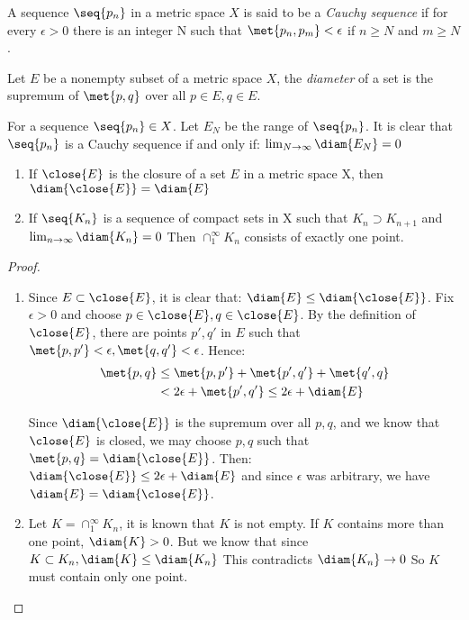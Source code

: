 \documentclass[12pt, letterpaper]{paper}
\begin{document}
A sequence $\seq{p_n}$ in a metric space $X$ is said to be a
\emph{Cauchy sequence} if for every $\epsilon >0$ there is an integer
N such that $\met{p_n, p_m} < \epsilon$ if $n \geq N$ and $m \geq N$.

Let $E$ be a nonempty subset of a metric space $X$, the
\emph{diameter} of a set is the supremum of $\met{p,q}$ over all
$p \in E, q \in E$.

For a sequence $\seq{p_{n}} \in X$. Let $E_N$ be the range of
$\seq{p_n}$. It is clear that $\seq{p_n}$ is a Cauchy sequence if and
only if: $\lim_{N\to\infty} \diam{ E_N } = 0$

\begin{theorem}
  \label{thr:3.10}
  \begin{enumerate}
  \item If $\close{E}$ is the closure of a set $E$ in a metric space
    X, then $\diam{\close{E}} = \diam{E}$
  \item If $\seq{K_n}$ is a sequence of compact sets in X such that
    $K_n \supset K_{n+1}$ and $\lim_{n\to \infty} \diam{K_n} = 0$ Then
    $\cap_1^{\infty} K_n$ consists of exactly one point.
  \end{enumerate}
\end{theorem}
\begin{proof}
  \begin{enumerate}
  \item Since $E \subset \close{E}$, it is clear that:
    $\diam{E} \leq \diam{\close{E}}$. Fix $\epsilon > 0$ and choose
    $p \in \close{E}, q \in \close{E}$. By the definition of
    $\close{E}$, there are points $p', q'$ in $E$ such that
    $\met{p, p'} < \epsilon, \met{q,q'} < \epsilon$. Hence:
    \begin{align*}
      \met{p,q} &\leq \met{ p, p'} + \met{ p', q'} + \met{ q', q}\\
                &< 2\epsilon + \met{ p', q'} \leq 2\epsilon + \diam{E}\\
    \end{align*}

    Since $\diam{\close{E}}$ is the supremum over all $p,q$, and we
    know that $\close{E}$ is closed, we may choose $p,q$ such that
    $\met{p,q} = \diam{\close{E}}$. Then:
    $\diam{\close{E}} \leq 2\epsilon + \diam{E}$ and since $\epsilon$
    was arbitrary, we have $\diam{E} = \diam{\close{E}}$.
  \item Let $K = \cap_1^{\infty} K_n$, it is known that $K$ is not
    empty. If $K$ contains more than one point, $\diam{K} > 0$. But we
    know that since $K \subset K_n, \diam{K} \leq \diam{K_n}$ This
    contradicts $\diam{K_n} \to 0$ So $K$ must contain only one point.
  \end{enumerate}
\end{proof}
\end{document}
